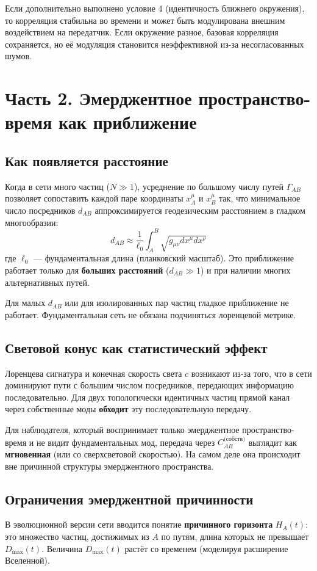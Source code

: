\documentclass[a4paper,12pt]{article}
\begin{document}
Если дополнительно выполнено условие 4 (идентичность ближнего окружения), то корреляция стабильна во времени и может быть модулирована внешним воздействием на передатчик. Если окружение разное, базовая корреляция сохраняется, но её модуляция становится неэффективной из-за несогласованных шумов.

\section*{Часть 2. Эмерджентное пространство-время как приближение}

\subsection{Как появляется расстояние}
Когда в сети много частиц (\(N \gg 1\)), усреднение по большому числу путей \(\Gamma_{AB}\) позволяет сопоставить каждой паре координаты \(x^\mu_A\) и \(x^\mu_B\) так, что минимальное число посредников \(d_{AB}\) аппроксимируется геодезическим расстоянием в гладком многообразии:
\[
d_{AB} \approx \frac{1}{\ell_0} \int_{A}^{B} \sqrt{g_{\mu\nu} dx^\mu dx^\nu}
\]
где \(\ell_0\) — фундаментальная длина (планковский масштаб). Это приближение работает только для \textbf{больших расстояний} (\(d_{AB} \gg 1\)) и при наличии многих альтернативных путей.

Для малых \(d_{AB}\) или для изолированных пар частиц гладкое приближение не работает. Фундаментальная сеть не обязана подчиняться лоренцевой метрике.

\subsection{Световой конус как статистический эффект}
Лоренцева сигнатура и конечная скорость света \(c\) возникают из-за того, что в сети доминируют пути с большим числом посредников, передающих информацию последовательно. Для двух топологически идентичных частиц прямой канал через собственные моды \textbf{обходит} эту последовательную передачу.

Для наблюдателя, который воспринимает только эмерджентное пространство-время и не видит фундаментальных мод, передача через \(C_{AB}^{\text{(собств)}}\) выглядит как \textbf{мгновенная} (или со сверхсветовой скоростью). На самом деле она происходит вне причинной структуры эмерджентного пространства.

\subsection{Ограничения эмерджентной причинности}
В эволюционной версии сети вводится понятие \textbf{причинного горизонта} \(H_A(t)\): это множество частиц, достижимых из \(A\) по путям, длина которых не превышает \(D_{\max}(t)\). Величина \(D_{\max}(t)\) растёт со временем (моделируя расширение Вселенной).
\end{document}
